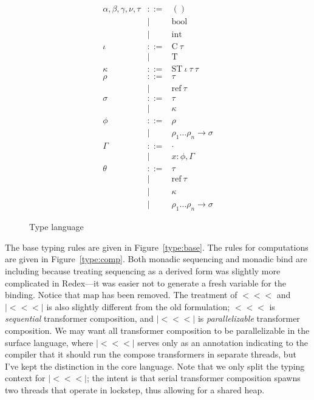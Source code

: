 \documentclass[twocolumn]{article}
\newcommand{\bnfdef}{::=}
\newcommand{\bnfalt}{\mathrel{\mid}}
\newcommand{\kw}[1]{\mbox{#1}}
\newcommand{\arr}{\mathrel{<\!\!<\!\!<}}
\newcommand{\parr}{\mathrel{|\!\!<\!\!<\!\!<\!\!|}}
\begin{document}
\begin{figure}
\begin{equation*}
\begin{array}{lcl}
  \alpha, \beta, \gamma, \nu, \tau
     & \bnfdef & () \\
     & \bnfalt & \kw{bool} \\
     & \bnfalt & \kw{int} \\
  \iota
     & \bnfdef & \kw{C}~ \tau \\
     & \bnfalt & \kw{T} \\
  \kappa
     & \bnfdef & \kw{ST}~ \iota~ \tau~ \tau~ \\
  \rho
     & \bnfdef & \tau \\
     & \bnfalt & \kw{ref}~ \tau \\
  \sigma
     & \bnfdef & \tau \\
     & \bnfalt & \kappa \\
  \phi
     & \bnfdef & \rho \\
     & \bnfalt & \rho_1 \ldots \rho_n \to \sigma \\
  \Gamma
     & \bnfdef & \cdot \\
     & \bnfalt & x : \phi, \Gamma \\
  \theta
     & \bnfdef & \tau \\
     & \bnfalt & \kw{ref}~ \tau \\
     & \bnfalt & \kappa \\
     & \bnfalt & \rho_1 \ldots \rho_n \to \sigma
\end{array}
\end{equation*}
\caption{Type language}
\label{fig:lang:type}
\end{figure}
The base typing rules are given in Figure~\ref{type:base}. The rules for
computations are given in Figure~\ref{type:comp}. Both monadic sequencing and
monadic bind are including because treating sequencing as a derived form was
slightly more complicated in Redex---it was easier not to generate a fresh
variable for the binding. Notice that $\kw{map}$ has been removed. The treatment
of $\arr$ and $\parr$ is also slightly different from the old formulation;
$\arr$ is \emph{sequential} transformer composition, and $\parr$ is
\emph{parallelizable} transformer composition. We may want all transformer
composition to be parallelizable in the surface language, where $\parr$ serves
only as an annotation indicating to the compiler that it should run the compose
transformers in separate threads, but I've kept the distinction in the core
language. Note that we only split the typing context for $\parr$; the intent is
that serial transformer composition spawns two threads that operate in lockstep,
thus allowing for a shared heap.
\end{document}
